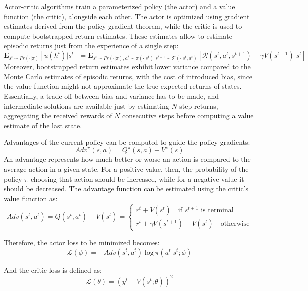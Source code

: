Actor-critic algorithms train a parameterized policy (the actor) and a value function (the critic), alongside each other. The actor is optimized using gradient 
estimates derived from the policy gradient theorem, while the critic is used to compute bootstrapped return estimates. These estimates allow to estimate episodic 
returns just from the experience of a single step:
\begin{equation}
    \mathbf{E}_{s^t\sim Pr(\cdot|\pi)}\left[u(h^t)|s^t\right] = \mathbf{E}_{s^t\sim Pr(\cdot|\pi),a^t\sim\pi(\cdot|s^t),s^{t+1}\sim \mathcal{T}(\cdot|s^t,a^t)}\left[\mathcal{R}(s^t,a^t,s^{t+1}) + \gamma V(s^{t+1})|s^t\right]
\end{equation}
Moreover, bootstrapped return estimates exhibit lower variance compared to the Monte Carlo estimates of episodic returns, with the cost of introduced bias, since the value function might not approximate the true expected returns of states.
Essentially, a trade-off between bias and variance has to be made, and intermediate solutions are available just by estimating $N$-step returns, aggregating the received rewards of $N$ consecutive steps before computing a value estimate of the last state.

Advantages of the current policy can be computed to guide the policy gradients:
\begin{equation}
    Adv^{\pi}(s,a) = Q^{\pi}(s,a) - V^{\pi}(s)
\end{equation}
An advantage represents how much better or worse an action is compared to the average action in a given state. 
For a positive value, then, the probability of the policy $\pi$ choosing that action should be increased, while for a negative value it should be decreased. The advantage function can be estimated using the critic's value function as:
\begin{equation}
    Adv(s^t,a^t) = Q(s^t,a^t) - V(s^t) = \begin{cases} r^t + V(s^t) \quad \text{if }s^{t+1}\text{ is terminal} \\
    r^t + \gamma V(s^{t+1}) - V(s^t) \quad \text{otherwise}
    \end{cases}
\end{equation} 

Therefore, the actor loss to be minimized becomes:
\begin{equation}
    \mathcal{L}(\phi) = -Adv(s^t,a^t)\log\pi(a^t|s^t;\phi)
\end{equation}

And the critic loss is defined as:
\begin{equation}
    \mathcal{L}(\theta) = (y^t - V(s^t;\theta))^2
\end{equation}

